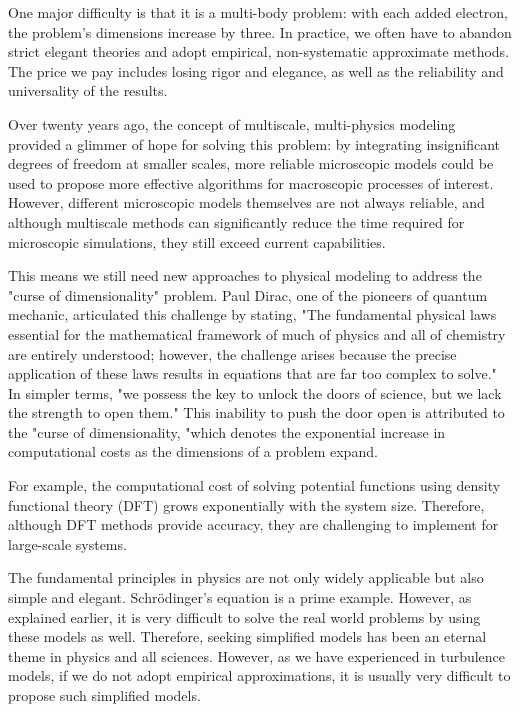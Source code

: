 One major difficulty is that it is a multi-body problem: with each added electron, the problem's dimensions increase by three. In practice, we often have to abandon strict elegant theories and adopt empirical, non-systematic approximate methods. The price we pay includes losing rigor and elegance, as well as the reliability and universality of the results.

Over twenty years ago, the concept of multiscale, multi-physics modeling provided a glimmer of hope for solving this problem: by integrating insignificant degrees of freedom at smaller scales, more reliable microscopic models could be used to propose more effective algorithms for macroscopic processes of interest. However, different microscopic models themselves are not always reliable, and although multiscale methods can significantly reduce the time required for microscopic simulations, they still exceed current capabilities.

This means we still need new approaches to physical modeling to address the "curse of dimensionality" problem. Paul Dirac, one of the pioneers of quantum mechanic, articulated this challenge by stating, "The fundamental physical laws essential for the mathematical framework of much of physics and all of chemistry are entirely understood; however, the challenge arises because the precise application of these laws results in equations that are far too complex to solve." In simpler terms, "we possess the key to unlock the doors of science, but we lack the strength to open them." This inability to push the door open is attributed to the "curse of dimensionality, "which denotes the exponential increase in computational costs as the dimensions of a problem expand.

For example, the computational cost of solving potential functions using density functional theory (DFT) grows exponentially with the system size. Therefore, although DFT methods provide accuracy, they are challenging to implement for large-scale systems.

The fundamental principles in physics are not only widely applicable but also simple and elegant. Schrödinger's equation is a prime example. However, as explained earlier, it is very difficult to solve the real world problems by using these models as well. Therefore, seeking simplified models has been an eternal theme in physics and all sciences. However, as we have experienced in turbulence models, if we do not adopt empirical approximations, it is usually very difficult to propose such simplified models.

